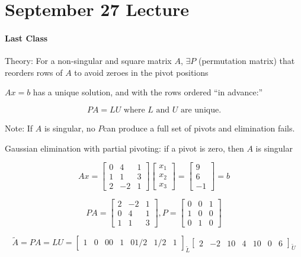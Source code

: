 \section{September 27 Lecture}

\paragraph{Last Class} Theory: For a non-singular and square matrix $A$, $\exists P$ (permutation matrix) that reorders rows of $A$ to avoid zeroes in the pivot positions

$Ax=b$ has a unique solution, and with the rows ordered ``in advance:''

\[
	P A = L U \text{ where } L \text{ and } U \text{ are unique.}
\]

Note: If $A$ is singular, no $P$can produce a full set of pivots and elimination fails.

Gaussian elimination with partial pivoting: if a pivot is zero, then $A$ is singular

\[
	A x = 
	\begin{bmatrix}
		0 & 4 & 1 \\
		1 & 1 & 3 \\
		2 & -2 & 1
	\end{bmatrix}
	\begin{bmatrix}
		x_1 \\ x_2 \\ x_3
	\end{bmatrix} = 
	\begin{bmatrix}
		9 \\ 6 \\ -1
	\end{bmatrix} = 
	b
\]

\[
	PA =
	\begin{bmatrix}
		2 & -2 & 1 \\
		0 & 4 & 1 \\
		1 & 1 & 3
	\end{bmatrix},
	P = 
	\begin{bmatrix}
		0 & 0 & 1 \\
		1 & 0 & 0 \\
		0 & 1 & 0
	\end{bmatrix}
\]

\[
	\tilde{A} = PA = LU = 
	\begin{bmatrix}
		1 & 0 & 0
		0 & 1 & 0
		1/2 & 1/2 & 1
	\end{bmatrix}_{\tilde{L}}
	\begin{bmatrix}
		2 & -2 & 1
		0 & 4 & 1
		0 & 0 & 6
	\end{bmatrix}_{\tilde{U}}
\]

